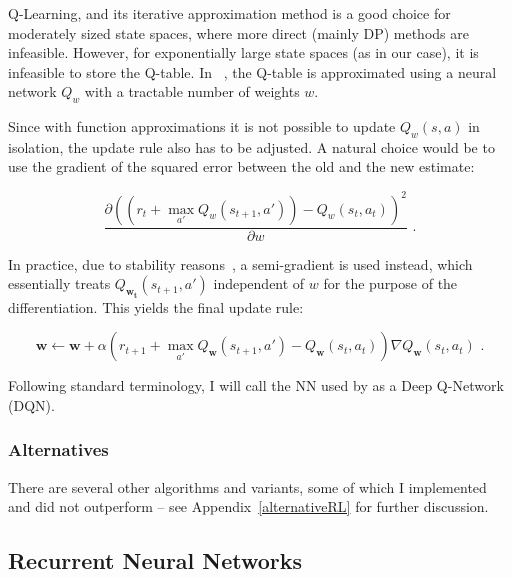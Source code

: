 \subsubsection*{\DQL} \label{deepq-learning}


Q-Learning, and its iterative approximation method is a good choice for moderately sized state spaces, where more direct (mainly DP) methods are infeasible. However, for exponentially large state spaces (as in our case), it is infeasible to store the Q-table. In \DQL~\cite{mnih2013DQN}, the Q-table is approximated using a neural network $Q_w$ with a tractable number of weights $w$.

Since with function approximations it is not possible to update $Q_w(s, a)$ in isolation, the update rule also has to be adjusted. A natural choice would be to use the gradient of the squared error between the old and the new estimate:

$$\frac{\partial (( r_t + \max_{a'} Q_w(s_{t+1}, a')) - Q_w(s_t,a_t))^2}{\partial w} \text{ .}$$

In practice, due to stability reasons~\cite{barnard1993semigradient},  a semi-gradient is used instead, which essentially treats $Q_{\mathbf{w_t}}(s_{t+1}, a')$ independent of $w$ for the purpose of the differentiation. This yields the final update rule:


\begin{equation} \label{eq:deep-q-learning-update-with-semi-gradient}
\mathbf{w} \leftarrow \mathbf{w} + \alpha\left( r_{t+1}+ \max_{a'} Q_{\mathbf{w}}(s_{t+1}, a') - Q_{\mathbf{w}}(s_t,a_t)\right)\nabla Q_{\mathbf{w}}(s_{t}, a_t) \text{ .}
\end{equation}

Following standard terminology, I will call the NN used by \DQL as a Deep Q-Network (DQN).

\subsubsection*{Alternatives}

There are several other algorithms and variants, some of which I implemented and did not outperform \DQL -- see Appendix~\ref{alternativeRL} for further discussion.


\subsection{Recurrent Neural Networks} \label{RNN}


